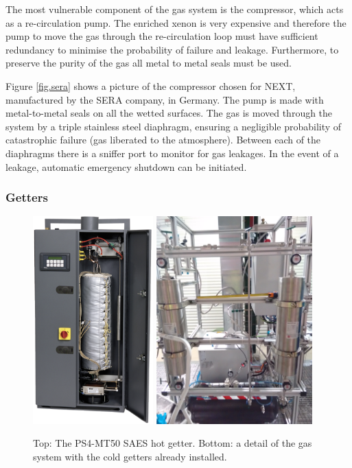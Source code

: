 The most vulnerable component of the gas system is the compressor, which acts as a re-circulation pump. The enriched xenon is very expensive and therefore the pump to move the gas through the re-circulation loop must have sufficient redundancy to minimise the probability of failure and leakage. Furthermore, to preserve the purity of the gas all metal to metal seals must be used. 

Figure \ref{fig.sera} shows a picture of the compressor chosen for NEXT, manufactured by the SERA company, in Germany. The pump is made with metal-to-metal seals on all the wetted surfaces. The gas is moved through the system by a triple stainless steel diaphragm, ensuring a negligible probability of catastrophic failure (gas liberated to the atmosphere). Between each of the diaphragms there is a sniffer port to monitor for gas leakages. In the event of a leakage, automatic emergency shutdown can be initiated. 

\subsubsection*{Getters}

\begin{figure}[hpt!]
\centering
\includegraphics[height=8cm]{img2/HotGetter.png}
\includegraphics[height=8cm]{img2/ColdGetters.png}
\caption{Top: The PS4-MT50 SAES hot getter. Bottom: a detail of the gas system with the cold getters already installed.} \label{fig:getter}
\end{figure}


